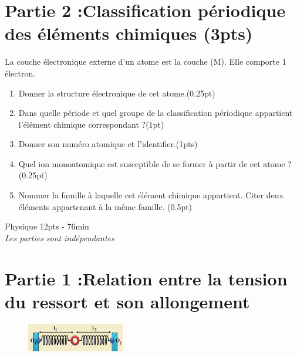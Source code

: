 \documentclass[12pt]{article}
\begin{document}
\section*{Partie 2 :Classification périodique des éléments chimiques \dotfill (3pts) }
La couche électronique externe d'un atome est la couche (M). Elle comporte 1 électron. 
\begin{enumerate}
    \item Donner la structure électronique de cet atome.\dotfill(0.25pt)

    \item Dans quelle période et quel groupe de la classification périodique appartient l'élément chimique correspondant ?\dotfill(1pt)
    \item Donner son numéro atomique et l'identifier.\dotfill(1pts)
    \item Quel ion monoatomique est susceptible de se former à partir de cet atome ? \dotfill(0.25pt)
 \item Nommer la famille à laquelle cet élément chimique appartient. Citer deux éléments appartenant à la
     même famille.  \dotfill(0.5pt)
\end{enumerate}



\begin{center}
\hrulefill
\Large{Physique 12pts - 76min}
\hrulefill\\
    \emph{Les  parties sont indépendantes}
\end{center}

\section*{Partie 1 :Relation entre la tension du ressort et son allongement }

\begin{figure}
	\vspace{-2.3cm}
 \begin{center}
	\includegraphics[width=0.38\textwidth]{./img/img00.png}
\end{center}
\end{figure}
\end{document}
